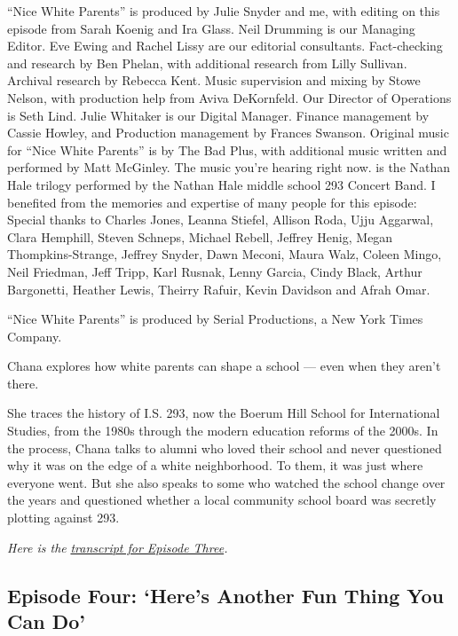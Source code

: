 ``Nice White Parents'' is produced by Julie Snyder and me, with editing
on this episode from Sarah Koenig and Ira Glass. Neil Drumming is our
Managing Editor. Eve Ewing and Rachel Lissy are our editorial
consultants. Fact-checking and research by Ben Phelan, with additional
research from Lilly Sullivan. Archival research by Rebecca Kent. Music
supervision and mixing by Stowe Nelson, with production help from Aviva
DeKornfeld. Our Director of Operations is Seth Lind. Julie Whitaker is
our Digital Manager. Finance management by Cassie Howley, and Production
management by Frances Swanson. Original music for ``Nice White Parents''
is by The Bad Plus, with additional music written and performed by Matt
McGinley. The music you're hearing right now. is the Nathan Hale trilogy
performed by the Nathan Hale middle school 293 Concert Band. I benefited
from the memories and expertise of many people for this episode: Special
thanks to Charles Jones, Leanna Stiefel, Allison Roda, Ujju Aggarwal,
Clara Hemphill, Steven Schneps, Michael Rebell, Jeffrey Henig, Megan
Thompkins-Strange, Jeffrey Snyder, Dawn Meconi, Maura Walz, Coleen
Mingo, Neil Friedman, Jeff Tripp, Karl Rusnak, Lenny Garcia, Cindy
Black, Arthur Bargonetti, Heather Lewis, Theirry Rafuir, Kevin Davidson
and Afrah Omar.

``Nice White Parents'' is produced by Serial Productions, a New York
Times Company.

Chana explores how white parents can shape a school --- even when they
aren't there.

She traces the history of I.S. 293, now the Boerum Hill School for
International Studies, from the 1980s through the modern education
reforms of the 2000s. In the process, Chana talks to alumni who loved
their school and never questioned why it was on the edge of a white
neighborhood. To them, it was just where everyone went. But she also
speaks to some who watched the school change over the years and
questioned whether a local community school board was secretly plotting
against 293.

\emph{Here is the}
\href{https://www.nytimes3xbfgragh.onion/2020/08/06/podcasts/episode-three-this-is-our-school-how-dare-you.html?showTranscript=1}{\emph{transcript
for Episode Three}}\emph{.}

\hypertarget{episode-four-heres-another-fun-thing-you-can-do}{%
\subsection{Episode Four: `Here's Another Fun Thing You Can
Do'}\label{episode-four-heres-another-fun-thing-you-can-do}}


